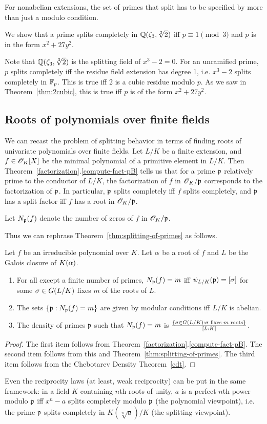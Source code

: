 For nonabelian extensions, the set of primes that split has to be specified by more than just a modulo condition.
\begin{ex}
We show that a prime splits completely in $\mathbb{Q}(\zeta_3,\sqrt[3]2)$ iff $p\equiv1 \pmod3$ and $p$ is in the form $x^2+27y^2$.

Note that $\mathbb{Q}(\zeta_3,\sqrt[3]2)$ is the splitting field of $x^3-2=0$. 
For an unramified prime, $p$ splits completely iff the residue field extension has degree 1, i.e. $x^3-2$ splits completely in $\mathbb{F}_p$. This is true iff 2 is a cubic residue modulo $p$. As we saw in Theorem~\ref{thm:2cubic}, this is true iff $p$ is of the form $x^2+27y^2$.
\end{ex}
\subsection{Roots of polynomials over finite fields}
We can recast the problem of splitting behavior in terms of finding roots of univariate polynomials over finite fields. Let $L/K$ be a finite extension, and $f\in \mathscr{O}_K[X]$ be the minimal polynomial of a primitive element in $L/K$. Then Theorem~\ref{factorization}.\ref{compute-fact-pB} tells us that for a prime $\mathfrak{p}$ relatively prime to the conductor of $L/K$, the factorization of $f$ in $\mathscr{O}_K/\mathfrak{p}$ corresponds to the factorization of $\mathfrak{p}$. In particular, $\mathfrak{p}$ splits completely iff $f$ splits completely, and $\mathfrak{p}$ has a split factor iff $f$ has a root in $\mathscr{O}_K/\mathfrak{p}$.
\begin{df}
Let $N_{\mathfrak{p}}(f)$ denote the number of zeros of $f$ in $\mathscr{O}_K/\mathfrak{p}$.
\end{df}

Thus we can rephrase Theorem~\ref{thm:splitting-of-primes} as follows.
\begin{thm}
Let $f$ be an irreducible polynomial over $K$. Let $\alpha$ be a root of $f$ and $L$ be the Galois closure of $K(\alpha)$. 
\begin{enumerate}
\item
For all except a finite number of primes, $N_{\mathfrak{p}}(f)=m$ iff $\psi_{L/K}(\mathfrak{p})=[\sigma]$ for some $\sigma\in G(L/K)$ fixes $m$ of the roots of $L$.
\item
The sets $\left\{{\mathfrak{p}}:{N_{\mathfrak{p}}(f)=m}\right\}$ are given by modular conditions iff $L/K$ is abelian.
\item
The density of primes $\mathfrak{p}$ such that $N_{\mathfrak{p}}(f)=m$ is $\frac{\left\{{\sigma \in G(L/K)}:{\sigma\text{ fixes $m$ roots}}\right\}}{[L:K]}$.
\end{enumerate}
\end{thm}
\begin{proof}
The first item follows from Theorem~\ref{factorization}.\ref{compute-fact-pB}. The second item follows from this and Theorem~\ref{thm:splitting-of-primes}. The third item follows from the Chebotarev Density Theorem~\ref{cdt}.
\end{proof}
Even the reciprocity laws (at least, weak reciprocity) can be put in the same framework: in a field $K$ containing $n$th roots of unity, $a$ is a perfect $n$th power modulo $\mathfrak{p}$ iff $x^n-a$ splits completely modulo $\mathfrak{p}$ (the polynomial viewpoint), i.e. the prime $\mathfrak{p}$ splits completely in $K(\sqrt[n]{a})/K$ (the splitting viewpoint).
